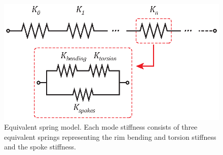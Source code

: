 \documentclass{bmd2016p}
\begin{document}
\begin{figure}[!ht]
\centering
\includegraphics[scale=1.0]{figures/bmd_figures-03.eps}
\caption{Equivalent spring model. Each mode stiffness consists of three equivalent springs representing the rim bending and torsion stiffness and the spoke stiffness.}
\label{fig:Kn}
\end{figure}
\end{document}
